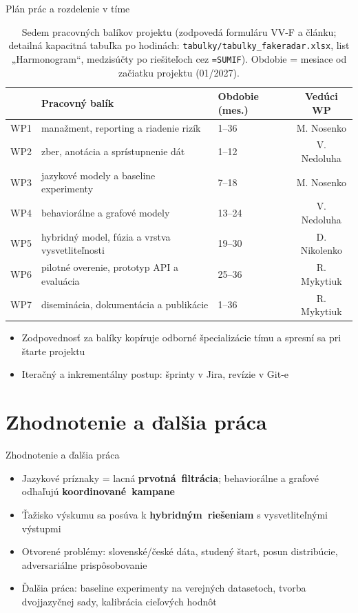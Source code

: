 \documentclass[10pt]{beamer}
\newcommand{\kw}[1]{\mbox{\textbf{#1}}}
\begin{document}
\begin{frame}{Plán prác a rozdelenie v tíme}
\begin{table}
\centering
\footnotesize
\begin{tabular}{@{}lllc@{}}
\toprule
 & Pracovný balík & Obdobie (mes.) & Vedúci WP \\
\midrule
WP1 & manažment, reporting a riadenie rizík & 1--36 & M. Nosenko \\
WP2 & zber, anotácia a sprístupnenie dát & 1--12 & V. Nedoluha \\
WP3 & jazykové modely a baseline experimenty & 7--18 & M. Nosenko \\
WP4 & behaviorálne a grafové modely & 13--24 & V. Nedoluha \\
WP5 & hybridný model, fúzia a vrstva vysvetliteľnosti & 19--30 & D. Nikolenko \\
WP6 & pilotné overenie, prototyp API a evaluácia & 25--36 & R. Mykytiuk \\
WP7 & diseminácia, dokumentácia a publikácie & 1--36 & R. Mykytiuk \\
\bottomrule
\end{tabular}
\caption{Sedem pracovných balíkov projektu (zodpovedá formuláru VV-F a článku; detailná kapacitná tabuľka po hodinách: \texttt{tabulky/tabulky\_fakeradar.xlsx}, list „Harmonogram“, medzisúčty po riešiteľoch cez \texttt{=SUMIF}). Obdobie = mesiace od začiatku projektu (01/2027).}
\end{table}
\begin{itemize}
\item Zodpovednosť za balíky kopíruje odborné špecializácie tímu a spresní sa pri štarte projektu
\item Iteračný a inkrementálny postup: šprinty v Jira, revízie v Git-e
\end{itemize}
\end{frame}

\section*{Zhodnotenie a ďalšia práca}
\begin{frame}{Zhodnotenie a ďalšia práca}
\begin{itemize}
\item Jazykové príznaky = lacná \kw{prvotná filtrácia}; behaviorálne a grafové odhaľujú \kw{koordinované kampane}
\item Ťažisko výskumu sa posúva k \kw{hybridným riešeniam} s vysvetliteľnými výstupmi
\item Otvorené problémy: slovenské/české dáta, studený štart, posun distribúcie, adversariálne prispôsobovanie
\item Ďalšia práca: baseline experimenty na verejných datasetoch, tvorba dvojjazyčnej sady, kalibrácia cieľových hodnôt
\end{itemize}
\end{frame}
\end{document}
